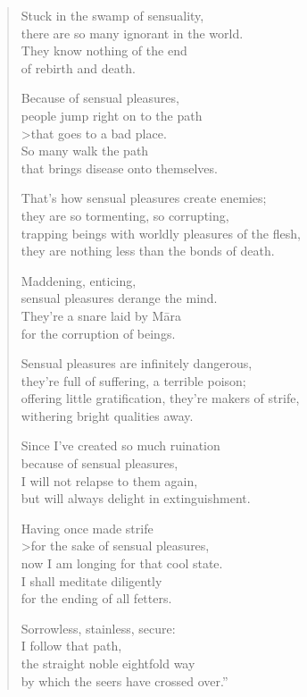 \documentclass[12pt,openany]{book}%
\begin{document}
\begin{verse}
Stuck in the swamp of sensuality, \\
there are so many ignorant in the world. \\
They know nothing of the end \\
of rebirth and death. 

Because of sensual pleasures, \\
people jump right on to the path \\>that goes to a bad place. \\
So many walk the path \\
that brings disease onto themselves. 

That’s how sensual pleasures create enemies; \\
they are so tormenting, so corrupting, \\
trapping beings with worldly pleasures of the flesh, \\
they are nothing less than the bonds of death. 

Maddening, enticing, \\
sensual pleasures derange the mind. \\
They’re a snare laid by \textsanskrit{Māra} \\
for the corruption of beings. 

Sensual pleasures are infinitely dangerous, \\
they’re full of suffering, a terrible poison; \\
offering little gratification, they’re makers of strife, \\
withering bright qualities away. 

Since I’ve created so much ruination \\
because of sensual pleasures, \\
I will not relapse to them again, \\
but will always delight in extinguishment. 

Having once made strife \\>for the sake of sensual pleasures, \\
now I am longing for that cool state. \\
I shall meditate diligently \\
for the ending of all fetters. 

Sorrowless, stainless, secure: \\
I follow that path, \\
the straight noble eightfold way \\
by which the seers have crossed over.” 


\end{verse}
\end{document}
